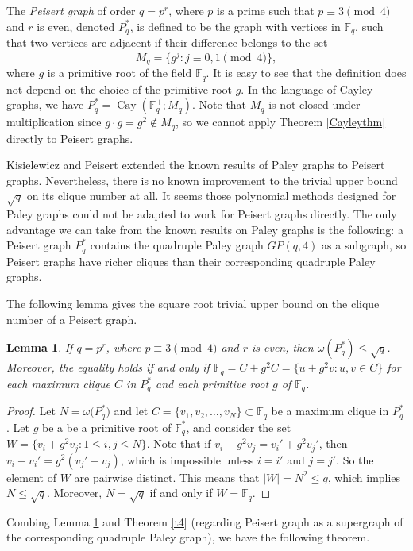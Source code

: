 \documentclass[12pt,oneside]{amsart}
\newtheorem{lem}[thm]{Lemma}
\newcommand{\F}{\mathbb{F}}
\begin{document}
The {\em Peisert graph} of order $q=p^r$, where $p$ is a prime such that $p \equiv 3 \pmod 4$ and $r$ is even, denoted $P^*_q$, is defined to be the graph with vertices in $\F_{q}$, such that two vertices are adjacent if their difference belongs to the set $$M_q=\{g^j: j \equiv 0,1 \pmod 4\},$$ where $g$ is a primitive root of the field $\F_q$. It is easy to see that the definition does not depend on the choice of the primitive root $g$. In the language of Cayley graphs, we have $P^*_q=\operatorname{Cay}(\F_{q}^+; M_q)$. Note that $M_q$ is not closed under multiplication since $g \cdot g=g^2 \notin M_q$, so we cannot apply Theorem \ref{Cayleythm} directly to Peisert graphs.

Kisielewicz and Peisert \cite{KP} extended the known results of Paley graphs to Peisert graphs. Nevertheless, there is no known improvement to the trivial upper bound $\sqrt{q}$ on its clique number at all. It seems those polynomial methods designed for Paley graphs could not be adapted to work for Peisert graphs directly. The only advantage we can take from the known results on Paley graphs is the following: a Peisert graph $P_q^*$ contains the quadruple Paley graph $GP(q,4)$ as a subgraph, so Peisert graphs have richer cliques than their corresponding quadruple Paley graphs.

The following lemma gives the square root trivial upper bound on the clique number of a Peisert graph. 

\begin{lem}\label{triv}
If $q=p^r$, where $p \equiv 3 \pmod 4$ and $r$ is even, then $\omega(P^*_q) \leq \sqrt{q}$. Moreover, the equality holds if and only if $\F_q=C+g^2C=\{u+g^2v: u,v \in C\}$ for each maximum clique $C$ in $P^*_q$ and each primitive root $g$ of $\F_q$.
\end{lem}
\begin{proof}
Let $N=\omega\big(P^*_q)$ and let $C=\{v_1, v_2, \ldots, v_N\} \subset \F_q$ be a maximum clique in $P^*_q$. Let $g$ be a be a primitive root of $\F_q^*$, and consider the set $W=\{v_i+g^2v_j: 1 \leq i,j \leq N\}$. 
Note that if $v_i+g^2v_j=v_i'+g^2v_j'$, then $v_i-v_i'=g^2(v_j'-v_j)$, which is impossible unless $i=i'$ and $j=j'$. So the element of $W$ are pairwise distinct. This means that $|W|=N^2 \leq q$, which implies $N \leq \sqrt{q}$. Moreover, $N=\sqrt{q}$ if and only if $W=\F_q$.
\end{proof}

Combing Lemma \ref{triv} and Theorem \ref{t4} (regarding Peisert graph as a supergraph of the corresponding quadruple Paley graph), we have the following theorem.
\end{document}
